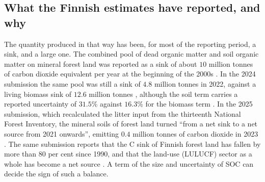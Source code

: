 \documentclass[11pt]{article}
\begin{document}
\subsection{What the Finnish estimates have reported, and why}
The quantity produced in that way has been, for most of the reporting period, a sink, and a large one. The combined pool of dead organic matter and soil organic matter on mineral forest land was reported as a sink of about $10$ million tonnes of carbon dioxide equivalent per year at the beginning of the 2000s \citep{Luke2025news}. In the 2024 submission the same pool was still a sink of $4.8$ million tonnes in 2022, against a
living biomass sink of $12.6$ million tonnes \citep{StatFin2024NID}, although the soil term carries a reported uncertainty of $31.5$\% against $16.3$\% for the biomass term \citep{LehtonenHeikkinen2015}.
In the 2025 submission, which recalculated the litter input from the thirteenth National Forest Inventory, the mineral soils of forest land turned ``from a net sink to a net source
from 2021 onwards'', emitting $0.4$ million tonnes of carbon dioxide in 2023
\citep{StatFin2025NID}. The same submission reports that the C sink of Finnish forest land has fallen by more than $80$ per cent since 1990, and that the land-use (LULUCF) sector as a whole has become a net source \citep{StatFin2025NID}.
A term of the size and uncertainty of SOC can decide the sign of such a balance.
\end{document}
